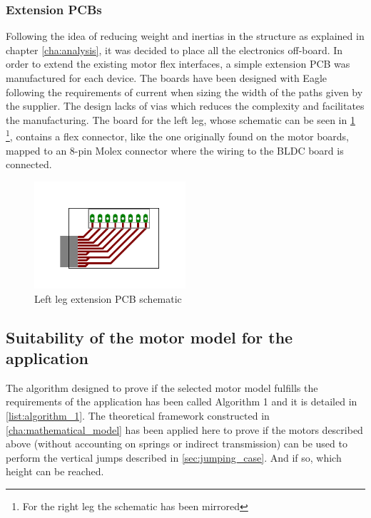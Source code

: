 
\subsubsection{Extension PCBs} %
\label{ssub:extension_pcbs}
Following the idea of reducing weight and inertias in the structure as explained in chapter \ref{cha:analysis}, it was decided to place all the electronics off-board.
In order to extend the existing motor flex interfaces, a simple extension PCB was manufactured for each device.
The boards have been designed with Eagle following the requirements of current when sizing the width of the paths given by the supplier.
The design lacks of vias which reduces the complexity and facilitates the manufacturing.
The board for the left leg, whose schematic can be seen in \ref{fig:pcb1} \footnote{For the right leg the schematic has been mirrored}, contains a flex connector, like the one originally found on the motor boards, mapped to an 8-pin Molex connector where the wiring to the BLDC board is connected.

\begin{figure}[ht]
	\centering
	\includegraphics[width=0.5\textwidth]{figures/expansion_board.pdf}
	\caption{Left leg extension PCB schematic}
	\label{fig:pcb1}
\end{figure}



\subsection{Suitability of the motor model for the application} %
\label{sub:suitability_of_the_motor_model_for_the_application}
The algorithm designed to prove if the selected motor model fulfills the requirements of the application has been called Algorithm 1 and it is detailed in \ref{list:algorithm_1}.
The theoretical framework constructed in \ref{cha:mathematical_model} has been applied here to prove if the motors described above (without accounting on springs or indirect transmission) can be used to perform the vertical jumps described in \ref{sec:jumping_case}.
And if so, which height can be reached.

